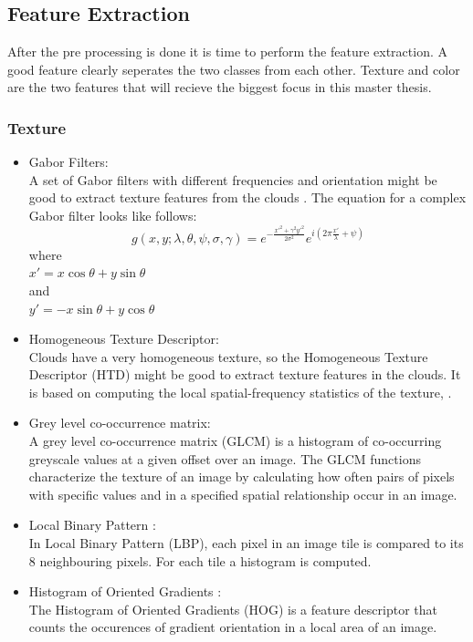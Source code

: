 \documentclass{article}
\begin{document}
\subsection{Feature Extraction}
After the pre processing is done it is time to perform the feature extraction. A good feature clearly seperates the two classes from each other. Texture and color are the two features that will recieve the biggest focus in this master thesis. 
\subsubsection{Texture}

\begin{itemize}
\item Gabor Filters: \\
A set of Gabor filters with different frequencies and orientation might be good to extract texture features from the clouds  \citep{gabor}.
The equation for a complex Gabor filter looks like follows:
\begin{equation}
g(x, y; \lambda, \theta, \psi, \sigma, \gamma) = e^{-\frac{x'^2 + \gamma^2y'^2}{2\sigma^2}}e^{i(2\pi\frac{x'}{\lambda} + \psi)}
\end{equation}
where \\
$x' = x\cos\theta + y\sin\theta$ \\
and \\
$y' = -x\sin\theta + y\cos\theta$

\item Homogeneous Texture Descriptor: \\
Clouds have a very homogeneous texture, so the Homogeneous Texture Descriptor (HTD) might be good to extract texture features in the clouds. It is based on computing the local spatial-frequency statistics of the texture, \citep{htd}.

\item Grey level co-occurrence matrix: \\
A grey level co-occurrence matrix (GLCM) is a histogram of co-occurring greyscale values at a given offset over an image. The GLCM functions characterize the texture of an image by calculating how often pairs of pixels with specific values and in a specified spatial relationship occur in an image.

\item Local Binary Pattern \citep{LBP}: \\ 
In Local Binary Pattern (LBP), each pixel in an image tile is compared to its 8 neighbouring pixels. For each tile a histogram is computed.
\item Histogram of Oriented Gradients \citep{hog}: \\
The Histogram of Oriented Gradients (HOG) is a feature descriptor that counts the occurences of gradient orientation in a local area of an image.
\end{itemize}
\end{document}
